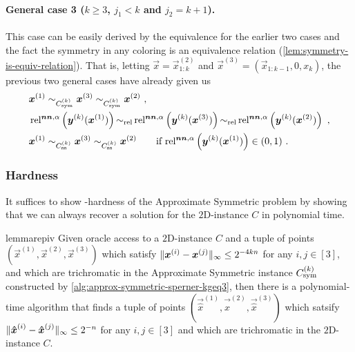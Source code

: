 \paragraph{General case 3 ($k\geq 3$, $j_1<k$ and $j_2=k+1$).} This case can be easily derived by the equivalence for the earlier two cases and the fact the symmetry in any coloring is an equivalence relation (\cref{lem:symmetry-is-equiv-relation}). 
That is, letting $\vec{x}=\vec{x}^{(2)}_{1:k}$ and $\vec{x}^{(3)}=(\vec{x}_{1:k-1},0,x_{k})$, the previous two general cases have already given us 
\begin{align*}
    &\boldsymbol{x}^{(1)} \sim_{C_{\rm sym}^{(k)}} \boldsymbol{x}^{(3)} \sim_{C_{\rm sym}^{(k)}} \boldsymbol{x}^{(2)}~,\\
    &\operatorname*{rel^{\boldsymbol{nn},\alpha}}\left(\boldsymbol{y}^{(k)}(\boldsymbol{x}^{(1)})\right) \operatorname*{\sim_{\rm rel}} \operatorname*{rel^{\boldsymbol{nn},\alpha}}\left(\boldsymbol{y}^{(k)}(\boldsymbol{x}^{(3)})\right) \operatorname*{\sim_{\rm rel}} \operatorname*{rel^{\boldsymbol{nn},\alpha}}\left(\boldsymbol{y}^{(k)}(\boldsymbol{x}^{(2)})\right)~,\\
    &\boldsymbol{x}^{(1)} \sim_{C_{\sf nn}^{(k)}} \boldsymbol{x}^{(3)} \sim_{C_{\sf nn}^{(k)}} \boldsymbol{x}^{(2)} \qquad \text{if $\operatorname*{rel^{\boldsymbol{nn},\alpha}}\left(\boldsymbol{y}^{(k)}(\boldsymbol{x}^{(1)})\right)\in (0,1)$}~.
\end{align*}

\subsubsection{Hardness}
It suffices to show \PPAD-hardness of the \outofk Approximate Symmetric \Sperner problem by showing that we can always recover a solution for the $2${\rm D}-\Sperner instance $C$ in polynomial time. 

\begin{restatable}[]{lemma}{repiv}
    \label{lem:poly-time-recovery-symmetry}
    Given oracle access to a $2${\rm D}-\Sperner instance $C$ and a tuple of points $(\vec{x}^{(1)}, \vec{x}^{(2)}, \vec{x}^{(3)})$ which satisfy $\| {\boldsymbol{x}^{(i)}-\boldsymbol{x}^{(j)}} \|_{\infty}\leq 2^{-4kn}$ for any $i,j\in [3]$, and which are trichromatic in the \outofk Approximate Symmetric \Sperner instance $C_{\rm sym}^{(k)}$ constructed by \cref{alg:approx-symmetric-sperner-kgeq3},
    then there is a polynomial-time algorithm that finds a tuple of points $(\vec{\hat{x}}^{(1)}, \vec{\hat{x}}^{(2)}, \vec{\hat{x}}^{(3)})$ which satsify $\| {\boldsymbol{\hat{x}}^{(i)}-\boldsymbol{\hat{x}}^{(j)}} \|_{\infty}\leq 2^{-n}$ for any $i,j\in [3]$ and which are trichromatic in the $2${\rm D}-\Sperner instance $C$.
\end{restatable}

